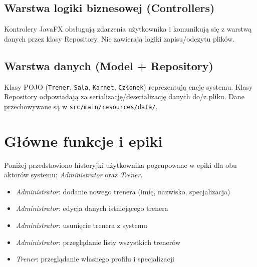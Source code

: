 \documentclass[11pt, a4paper]{article}
\newcommand{\actor}[1]{\textit{\color{secondary}#1}}
\begin{document}
\subsection{Warstwa logiki biznesowej (Controllers)}

Kontrolery JavaFX obsługują zdarzenia użytkownika i komunikują się z warstwą danych przez
klasy Repository. Nie zawierają logiki zapisu/odczytu plików.

\subsection{Warstwa danych (Model + Repository)}

Klasy POJO (\texttt{Trener}, \texttt{Sala}, \texttt{Karnet}, \texttt{Członek}) reprezentują
encje systemu. Klasy Repository odpowiadają za serializację/deserializację danych do/z pliku.
Dane przechowywane są w \newline
\texttt{src/main/resources/data/}.

\newpage
\section{Główne funkcje i epiki}

Poniżej przedstawiono historyjki użytkownika pogrupowane w epiki dla obu aktorów systemu: \actor{Administrator} oraz \actor{Trener}.


\begin{tcolorbox}[epicbox, title={Epik 1 — Zarządzanie trenerami}]
\begin{itemize}[leftmargin=*, itemsep=2pt, label=\color{secondary}$\triangleright$]
  \item \actor{Administrator}: dodanie nowego trenera (imię, nazwisko, specjalizacja)
  \item \actor{Administrator}: edycja danych istniejącego trenera
  \item \actor{Administrator}: usunięcie trenera z systemu
  \item \actor{Administrator}: przeglądanie listy wszystkich trenerów
  \item \actor{Trener}: przeglądanie własnego profilu i specjalizacji
\end{itemize}
\end{tcolorbox}
\end{document}
